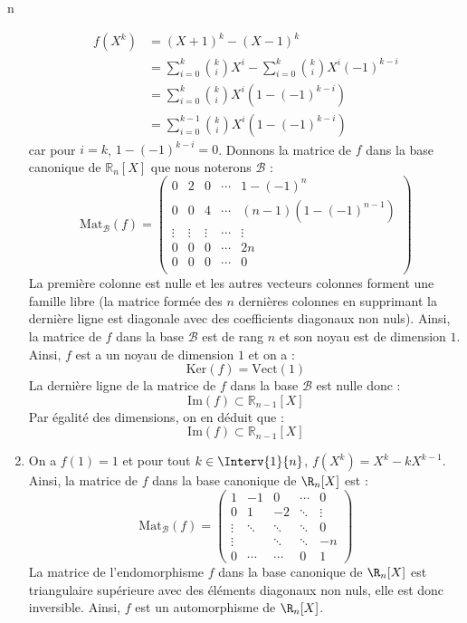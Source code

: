 n\documentclass[a4paper,10pt]{report}
\begin{document}
\begin{enumerate}
\begin{align*}
f(X^k) & = (X+1)^k - (X-1)^k \\
& = \sum_{i=0}^k \binom{k}{i} X^i - \sum_{i=0}^k \binom{k}{i} X^i (-1)^{k-i} \\
& =\sum_{i=0}^k \binom{k}{i} X^i  (1-(-1)^{k-i}) \\
& =\sum_{i=0}^{k-1} \binom{k}{i} X^i  (1-(-1)^{k-i}) 
\end{align*}
car pour $i=k$, $1-(-1)^{k-i}=0$. Donnons la matrice de $f$ dans la base canonique de $\mathbb{R}_n[X]$ que nous noterons $\mathcal{B}$ :
$$ \textrm{Mat}_{\mathcal{B}}(f) = \begin{pmatrix}
0 &   2 & 0 &  \cdots & 1-(-1)^n  \\
0 &  0  & 4 & \cdots &  (n-1) (1-(-1)^{n-1}) \\
\vdots & \vdots & \vdots & \cdots &  \vdots \\
0 &  0 & 0 &  \cdots & 2n  \\
0 &  0 & 0 &  \cdots& 0 \\
\end{pmatrix}$$
La première colonne est nulle et les autres vecteurs colonnes forment une famille libre (la matrice formée des $n$ dernières colonnes en supprimant la dernière ligne est diagonale avec des coefficients diagonaux non nuls). Ainsi, la matrice de $f$ dans la base $\mathcal{B}$ est de rang $n$ et son noyau est de dimension $1$. Ainsi, $f$ est a un noyau de dimension $1$ et on a :
$$ \textrm{Ker}(f) = \textrm{Vect}(1) $$
La dernière ligne de la matrice de $f$ dans la base $\mathcal{B}$ est nulle donc :
$$ \textrm{Im}(f) \subset \mathbb{R}_{n-1}[X]$$
Par égalité des dimensions, on en déduit que :
$$  \textrm{Im}(f) \subset \mathbb{R}_{n-1}[X]$$
\item On a $f(1)=1$ et pour tout $k \in \Interv{1}{n}$, $f(X^k)=X^k-kX^{k-1}$. Ainsi, la matrice de $f$ dans la base canonique de $\R_n[X]$ est : 
$$\textrm{Mat}_{\mathcal{B}}(f)=\begin{pmatrix}
1&-1&0&\cdots&0\\0&1&-2&\ddots&\vdots\\ \vdots&\ddots&\ddots&\ddots&0\\\vdots&&\ddots&\ddots&-n\\0&\cdots&\cdots&0&1
\end{pmatrix}$$
La matrice de l'endomorphisme $f$ dans la base canonique de $\R_n[X]$ est triangulaire supérieure avec des éléments diagonaux non nuls, elle est donc inversible. Ainsi, $f$ est un automorphisme de $\R_n[X]$.
\end{enumerate}
\end{document}
